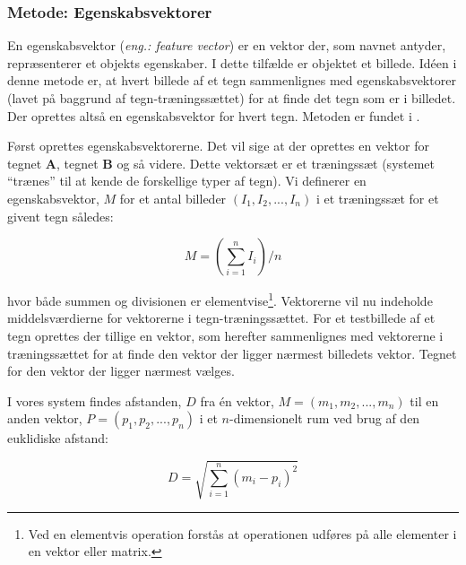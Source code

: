 
\subsubsection*{Metode: Egenskabsvektorer}
En egenskabsvektor (\textit{eng.: feature vector}) er en vektor der, som navnet antyder, repræsenterer et objekts egenskaber. I dette tilfælde er objektet et billede. Idéen i denne metode er, at hvert billede af et tegn sammenlignes med egenskabsvektorer (lavet på baggrund af tegn-træningssættet) for at finde det tegn som er i billedet. Der oprettes altså en egenskabsvektor for hvert tegn. Metoden er fundet i \cite{arth}.

Først oprettes egenskabsvektorerne. Det vil sige at der oprettes en vektor for tegnet \textbf{A}, tegnet \textbf{B} og så videre. Dette vektorsæt er et træningssæt (systemet ``trænes'' til at kende de forskellige typer af tegn). Vi definerer en egenskabsvektor, $M$ for et antal billeder $(I_{1},I_{2},...,I_{n})$ i et træningssæt for et givent tegn således:

\begin{displaymath}
	M = (\sum_{i=1}^{n}I_i)/n
\end{displaymath}


hvor både summen og divisionen er elementvise\footnote{Ved en elementvis operation forstås at operationen udføres på alle elementer i en vektor eller matrix.}. Vektorerne vil nu indeholde middelsværdierne for vektorerne i tegn-træningssættet. For et testbillede af et tegn oprettes der tillige en vektor, som herefter sammenlignes med vektorerne i træningssættet for at finde den vektor der ligger nærmest billedets vektor. Tegnet for den vektor der ligger nærmest vælges.

I vores system findes afstanden, $D$ fra én vektor, $M = (m_{1},m_{2},...,m_{n})$ til en anden vektor, $P = (p_{1},p_{2},...,p_{n})$ i et $n$-dimensionelt rum ved brug af den euklidiske afstand\cite{wiki_euclid}:

\begin{displaymath}
	D = \sqrt{\sum_{i=1}^{n}(m_{i}-p_{i})^{2}}
\end{displaymath}

